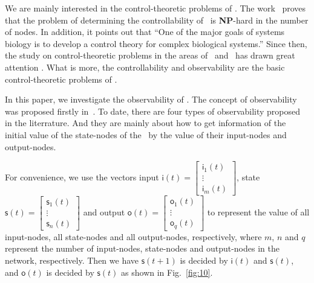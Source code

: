 We are mainly interested in the control-theoretic problems of \BCNs. The work~\cite{Akutsu2007Control} proves that the problem of determining the controllability of \BCNs\ is {\bf NP}-hard in the number of nodes. In addition, it points out that ``One of the major goals of systems biology is to develop a control theory for complex biological systems.'' Since then, the study on control-theoretic problems in the areas of \BNs\ and \BCNs\ has drawn great attention \cite{cheng2009controllability, Zhao2010Input, Cheng2011Identification, Cheng2011Analysis,Fornasini2013Observability}. What is more, the controllability and observability are the basic control-theoretic problems of \BCNs. %

In this paper, we investigate the observability of \BCNs. The concept of observability was proposed firstly in~\cite{cheng2009controllability}. To date, there are four types of observability proposed in the literrature. And they are mainly about how to get  information of the initial value of the state-nodes of the \BCNs\ by the value of their input-nodes and output-nodes. 

For convenience, we use the vectors input $\mathsf{i}(t)=\begin{bmatrix}\mathsf{i}_1(t)\\ \vdots \\\mathsf{i}_m(t)\end{bmatrix}$, state $\mathsf{s}(t)=\begin{bmatrix}\mathsf{s}_1(t)\\ \vdots \\\mathsf{s}_n(t)\end{bmatrix}$ and output $\mathsf{o}(t)=\begin{bmatrix}\mathsf{o}_1(t)\\ \vdots \\\mathsf{o}_q(t)\end{bmatrix}$ to represent the value of all input-nodes, all state-nodes and all output-nodes, respectively, where $m$, $n$ and $q$ represent the number of input-nodes, state-nodes and output-nodes in the network, respectively. 
 Then we have $\mathsf{s}(t+1)$ is decided by $\mathsf{i}(t)$ and $\mathsf{s}(t)$, and $\mathsf{o}(t)$ is decided by $\mathsf{s}(t)$ as shown in Fig.~\ref{fig:10}.


